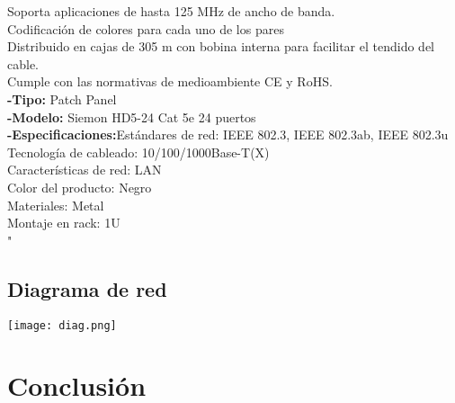 \documentclass{udpreport}
\begin{document}
Soporta aplicaciones de hasta 125 MHz de ancho de banda.\\
Codificación de colores para cada uno de los pares\\
Distribuido en cajas de 305 m con bobina interna para facilitar el tendido del cable.\\
Cumple con las normativas de medioambiente CE y RoHS.\\
{\bf-Tipo:} Patch Panel\\
{\bf-Modelo:} Siemon HD5-24 Cat 5e 24 puertos\\
{\bf-Especificaciones:}Estándares de red: IEEE 802.3, IEEE 802.3ab, IEEE 802.3u\\
Tecnología de cableado: 10/100/1000Base-T(X)\\
Características de red: LAN\\
Color del producto: Negro\\
Materiales: Metal\\
Montaje en rack: 1U\\"
\section{Diagrama de red}
\texttt{[image: diag.png]}
\chapter{Conclusión}
\end{document}
